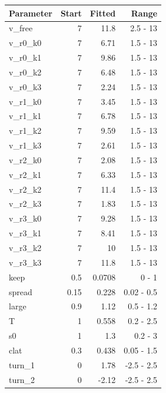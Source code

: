 \begin{tabular}{|l|r|r|r|}
\hline
\textbf{Parameter} & \textbf{Start} & \textbf{Fitted} & \textbf{Range} \\
\hline
v\_free & 7 & 11.8 & 2.5 - 13 \\
v\_r0\_k0 & 7 & 6.71 & 1.5 - 13 \\
v\_r0\_k1 & 7 & 9.86 & 1.5 - 13 \\
v\_r0\_k2 & 7 & 6.48 & 1.5 - 13 \\
v\_r0\_k3 & 7 & 2.24 & 1.5 - 13 \\
v\_r1\_k0 & 7 & 3.45 & 1.5 - 13 \\
v\_r1\_k1 & 7 & 6.78 & 1.5 - 13 \\
v\_r1\_k2 & 7 & 9.59 & 1.5 - 13 \\
v\_r1\_k3 & 7 & 2.61 & 1.5 - 13 \\
v\_r2\_k0 & 7 & 2.08 & 1.5 - 13 \\
v\_r2\_k1 & 7 & 6.33 & 1.5 - 13 \\
v\_r2\_k2 & 7 & 11.4 & 1.5 - 13 \\
v\_r2\_k3 & 7 & 1.83 & 1.5 - 13 \\
v\_r3\_k0 & 7 & 9.28 & 1.5 - 13 \\
v\_r3\_k1 & 7 & 8.41 & 1.5 - 13 \\
v\_r3\_k2 & 7 & 10 & 1.5 - 13 \\
v\_r3\_k3 & 7 & 11.8 & 1.5 - 13 \\
keep & 0.5 & 0.0708 & 0 - 1 \\
spread & 0.15 & 0.228 & 0.02 - 0.5 \\
large & 0.9 & 1.12 & 0.5 - 1.2 \\
T & 1 & 0.558 & 0.2 - 2.5 \\
s0 & 1 & 1.3 & 0.2 - 3 \\
clat & 0.3 & 0.438 & 0.05 - 1.5 \\
turn\_1 & 0 & 1.78 & -2.5 - 2.5 \\
turn\_2 & 0 & -2.12 & -2.5 - 2.5 \\
\hline
\end{tabular}

